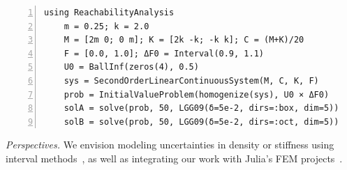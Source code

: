 \documentclass{juliacon}
\begin{document}
\begin{lstlisting}[label=ejemplo, numbers=left, aboveskip=0.55cm, belowskip=0.5cm]
	using ReachabilityAnalysis
	m = 0.25; k = 2.0
	M = [2m 0; 0 m]; K = [2k -k; -k k]; C = (M+K)/20
	F = [0.0, 1.0]; ΔF0 = Interval(0.9, 1.1)
	U0 = BallInf(zeros(4), 0.5)
	sys = SecondOrderLinearContinuousSystem(M, C, K, F)
	prob = InitialValueProblem(homogenize(sys), U0 × ΔF0)
	solA = solve(prob, 50, LGG09(δ=5e-2, dirs=:box, dim=5))
	solB = solve(prob, 50, LGG09(δ=5e-2, dirs=:oct, dim=5))
\end{lstlisting}

\noindent \emph{Perspectives.} We envision modeling uncertainties in density or stiffness using interval methods~\cite{forets2021intervalmat, ferranti2021interval}, as well as integrating our work with Julia's FEM projects~\cite{Gridap,Ferrite,FinEtools}.


	
\end{document}
